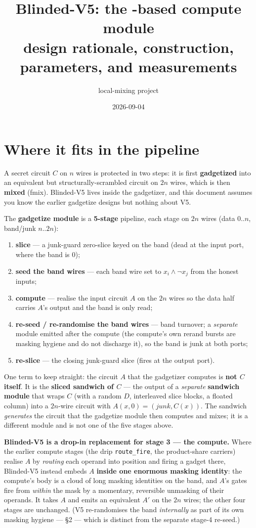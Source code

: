 \documentclass[11pt]{article}
\title{Blinded-V5: the \lgi-based compute module\\
  \large design rationale, construction, parameters, and measurements}
\author{local-mixing project}
\date{2026-09-04}
\newcommand{\doc}[1]{\texttt{#1}}
\begin{document}
\maketitle

\section*{Where it fits in the pipeline}

A secret circuit $C$ on $n$ wires is protected in two steps: it is first
\textbf{gadgetized} into an equivalent but structurally-scrambled circuit on $2n$
wires, which is then \textbf{mixed} (fmix). Blinded-V5 lives inside the
gadgetizer, and this document assumes you know the earlier gadgetize designs but
nothing about V5.

The \textbf{gadgetize module} is a \textbf{5-stage} pipeline, each stage on $2n$
wires (data $0..n$, band/junk $n..2n$):

\begin{enumerate}
\item \textbf{slice} --- a junk-guard zero-slice keyed on the band (dead at the
  input port, where the band is 0);
\item \textbf{seed the band wires} --- each band wire set to $x_i \land \lnot x_j$
  from the honest inputs;
\item \textbf{compute} --- realise the input circuit $A$ on the $2n$ wires so the
  data half carries $A$'s output and the band is only read;
\item \textbf{re-seed / re-randomise the band wires} --- band turnover; a
  \emph{separate} module emitted after the compute (the compute's own rerand bursts
  are masking hygiene and do not discharge it), so the band is junk at both ports;
\item \textbf{re-slice} --- the closing junk-guard slice (fires at the output
  port).
\end{enumerate}

One term to keep straight: the circuit $A$ that the gadgetizer computes is
\textbf{not $C$ itself}. It is the \textbf{sliced sandwich of $C$} --- the output
of a \emph{separate} \textbf{sandwich module} that wraps $C$ (with a random $D$,
interleaved slice blocks, a floated column) into a $2n$-wire circuit with
$A(x,0) = (\mathit{junk}, C(x))$. The sandwich \emph{generates} the circuit that
the gadgetize module then computes and mixes; it is a different module and is not
one of the five stages above.

\textbf{Blinded-V5 is a drop-in replacement for stage 3 --- the compute.} Where
the earlier compute stages (the drip \doc{route\_fire}, the product-share
carriers) realise $A$ by \emph{routing} each operand into position and firing a
gadget there, Blinded-V5 instead embeds $A$ \textbf{inside one enormous masking
identity}: the compute's body is a cloud of long masking identities on the band,
and $A$'s gates fire from \emph{within} the mask by a momentary, reversible
unmasking of their operands. It takes $A$ and emits an equivalent $A'$ on the $2n$
wires; the other four stages are unchanged. (V5 re-randomises the band
\emph{internally} as part of its own masking hygiene --- \S2 --- which is distinct
from the separate stage-4 re-seed.)
\end{document}
